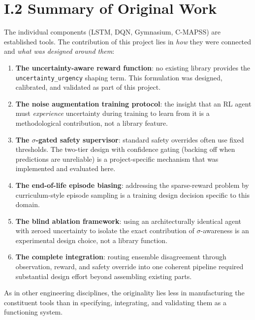 \documentclass[12pt,a4paper]{report}
\begin{document}
\section*{I.2 Summary of Original Work}

The individual components (LSTM, DQN, Gymnasium, C-MAPSS) are established tools. The contribution of this project lies in \textit{how} they were connected and \textit{what was designed around them}:

\begin{enumerate}
    \item \textbf{The uncertainty-aware reward function}: no existing library provides the \texttt{uncertainty\_urgency} shaping term. This formulation was designed, calibrated, and validated as part of this project.
    \item \textbf{The noise augmentation training protocol}: the insight that an RL agent must \textit{experience} uncertainty during training to learn from it is a methodological contribution, not a library feature.
    \item \textbf{The $\sigma$-gated safety supervisor}: standard safety overrides often use fixed thresholds. The two-tier design with confidence gating (backing off when predictions are unreliable) is a project-specific mechanism that was implemented and evaluated here.
    \item \textbf{The end-of-life episode biasing}: addressing the sparse-reward problem by curriculum-style episode sampling is a training design decision specific to this domain.
    \item \textbf{The blind ablation framework}: using an architecturally identical agent with zeroed uncertainty to isolate the exact contribution of $\sigma$-awareness is an experimental design choice, not a library function.
    \item \textbf{The complete integration}: routing ensemble disagreement through observation, reward, and safety override into one coherent pipeline required substantial design effort beyond assembling existing parts.
\end{enumerate}

\noindent As in other engineering disciplines, the originality lies less in manufacturing the constituent tools than in specifying, integrating, and validating them as a functioning system.
\end{document}
